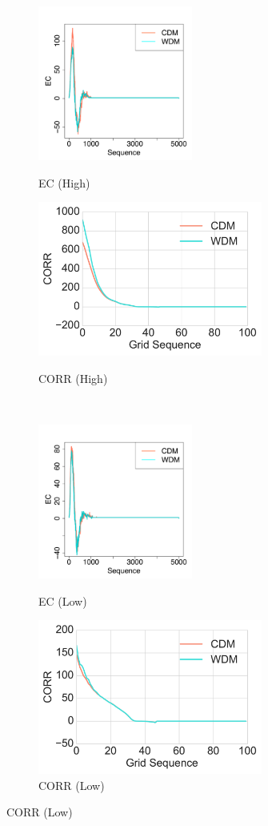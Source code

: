 \documentclass[12pt]{article}
\begin{document}
\begin{figure}[htp!]
  \centering
    \begin{subfigure}{0.48\textwidth}
    \centering
        \caption{EC (High)}
\includegraphics[height = 2in]{figure_13_max_margin_2euler.pdf}
    \label{fig:valid1}
  \end{subfigure}
    \begin{subfigure}{0.48\textwidth}
    \centering
        \caption{CORR (High)}
\includegraphics[height = 2in]{figure_13_max_margin_corr.pdf}
    \label{fig:valid2}
  \end{subfigure} \\
    \begin{subfigure}{0.48\textwidth}
    \centering
        \caption{EC (Low)}
\includegraphics[height = 2in]{figure_13_min_margin_2euler.pdf}
    \label{fig:valid3}
  \end{subfigure}
    \begin{subfigure}{0.48\textwidth}
    \centering
        \caption{CORR (Low)}
\includegraphics[height = 2in]{figure_13_min_margin_corr.pdf}

\end{subfigure}
\end{figure}
\end{document}
